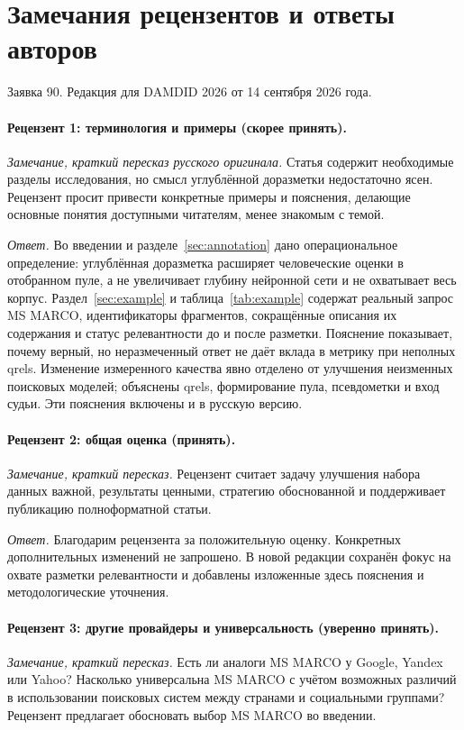 \section*{Замечания рецензентов и ответы авторов}
\label{sec:responses}
\noindent Заявка 90. Редакция для DAMDID 2026 от 14 сентября 2026 года.

\paragraph{Рецензент 1: терминология и примеры (скорее принять).}
\emph{Замечание, краткий пересказ русского оригинала.} Статья содержит необходимые разделы исследования, но смысл углублённой доразметки недостаточно ясен. Рецензент просит привести конкретные примеры и пояснения, делающие основные понятия доступными читателям, менее знакомым с темой.

\emph{Ответ.} Во введении и разделе~\ref{sec:annotation} дано операциональное определение: углублённая доразметка расширяет человеческие оценки в отобранном пуле, а не увеличивает глубину нейронной сети и не охватывает весь корпус. Раздел~\ref{sec:example} и таблица~\ref{tab:example} содержат реальный запрос MS MARCO, идентификаторы фрагментов, сокращённые описания их содержания и статус релевантности до и после разметки. Пояснение показывает, почему верный, но неразмеченный ответ не даёт вклада в метрику при неполных qrels. Изменение измеренного качества явно отделено от улучшения неизменных поисковых моделей; объяснены qrels, формирование пула, псевдометки и вход судьи. Эти пояснения включены и в русскую версию.

\paragraph{Рецензент 2: общая оценка (принять).}
\emph{Замечание, краткий пересказ.} Рецензент считает задачу улучшения набора данных важной, результаты ценными, стратегию обоснованной и поддерживает публикацию полноформатной статьи.

\emph{Ответ.} Благодарим рецензента за положительную оценку. Конкретных дополнительных изменений не запрошено. В новой редакции сохранён фокус на охвате разметки релевантности и добавлены изложенные здесь пояснения и методологические уточнения.

\paragraph{Рецензент 3: другие провайдеры и универсальность (уверенно принять).}
\emph{Замечание, краткий пересказ.} Есть ли аналоги MS MARCO у Google, Yandex или Yahoo? Насколько универсальна MS MARCO с учётом возможных различий в использовании поисковых систем между странами и социальными группами? Рецензент предлагает обосновать выбор MS MARCO во введении.

